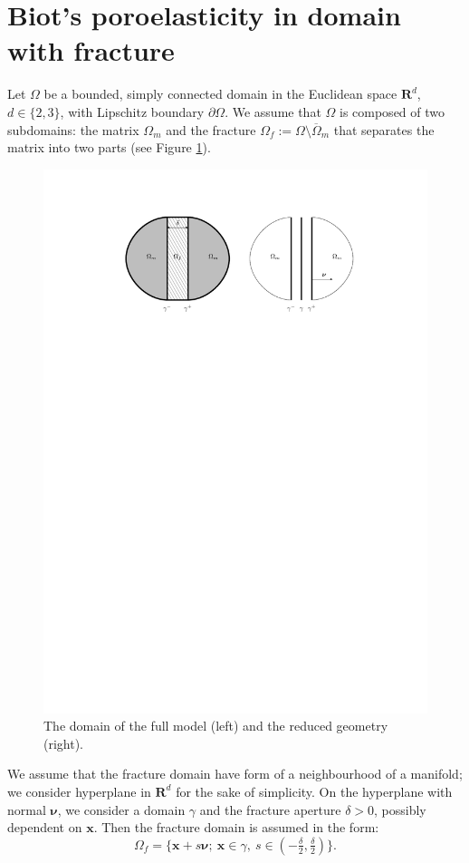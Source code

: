 \documentclass[a4paper]{article}
\numberwithin{equation}{section}
\def\nnu{\boldsymbol\nu}
\def\Real{{\mathbf R}} %
\def\vc#1{\mathbf{#1}}     %
\def\xx{\vc x}
\newcommand{\eqs}[1]{\begin{equation*}#1\end{equation*}}
\begin{document}
\section{Biot's poroelasticity in domain with fracture}\label{sec:model}
Let $\Omega$ be a bounded, simply connected domain in the Euclidean space $\Real^d$, $d\in\{2,3\}$, with Lipschitz boundary $\partial\Omega$.
We assume that $\Omega$ is composed of two subdomains: the matrix $\Omega_m$ and the fracture $\Omega_f:=\Omega\setminus\overline\Omega_m$ that separates the matrix into two parts (see Figure \ref{fig:omegas}). 
\begin{figure}[h]
\centering
\includegraphics[width=\textwidth]{figures/omegas}
\caption{The domain of the full model (left) and the reduced geometry (right).}
\label{fig:omegas}
\end{figure}

We assume that the fracture domain have form of a neighbourhood of a manifold; we consider hyperplane in $\Real^d$ for the sake of simplicity. On the hyperplane with normal $\nnu$,  we consider a domain $\gamma$ and the fracture aperture $\delta > 0$, possibly dependent on $\vc x$. Then the fracture domain is assumed in the form:
\eqs{ \Omega_f = \{\xx+s\nnu;~\xx\in\gamma,~s\in(-\tfrac\delta2,\tfrac\delta2)\}. } 
\end{document}
